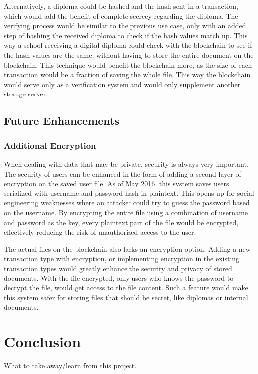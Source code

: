 \documentclass[12pt]{article}
\begin{document}
Alternatively, a diploma could be hashed and the hash sent in a transaction, which would add the benefit of complete secrecy regarding the diploma. The verifying process would be similar to the previous use case, only with an added step of hashing the received diploma to check if the hash values match up. This way a school receiving a digital diploma could check with the blockchain to see if the hash values are the same, without having to store the entire document on the blockchain. This technique would benefit the blockchain more, as the size of each transaction would be a fraction of saving the whole file. This way the blockchain would serve only as a verification system and would only supplement another storage server. 

\subsection{Future Enhancements}
\subsubsection{Additional Encryption}
When dealing with data that may be private, security is always very important. The security of users can be enhanced in the form of adding a second layer of encryption on the saved user file. As of May 2016, this system saves users serialized with username and password hash in plaintext. This opens up for social engineering weaknesses where an attacker could try to guess the password based on the username. By encrypting the entire file using a combination of username and password as the key, every plaintext part of the file would be encrypted, effectively reducing the risk of unauthorized access to the user. 

The actual files on the blockchain also lacks an encryption option. Adding a new transaction type with encryption, or implementing encryption in the existing transaction types would greatly enhance the security and privacy of stored documents. With the file encrypted, only users who knows the password to decrypt the file, would get access to the file content. Such a feature would make this system safer for storing files that should be secret, like diplomas or internal documents. 


\section{Conclusion}
What to take away/learn from this project.

\newpage
 

\listoffigures
\end{document}
